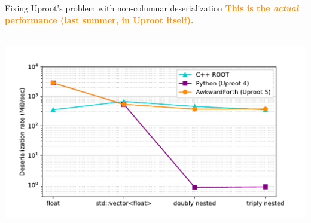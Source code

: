 \documentclass[aspectratio=169]{beamer}
\begin{document}
\begin{frame}{Fixing Uproot's problem with non-columnar deserialization}
\vspace{0.25 cm}
\textcolor{darkorange}{\bf \centering This is the {\it actual} performance (last summer, in Uproot itself).}

\mbox{ } \hfill \includegraphics[width=0.9\linewidth]{PLOTS/awkwardforth-in-uproot-performance.pdf} \hfill \mbox{ }
\end{frame}
\end{document}
